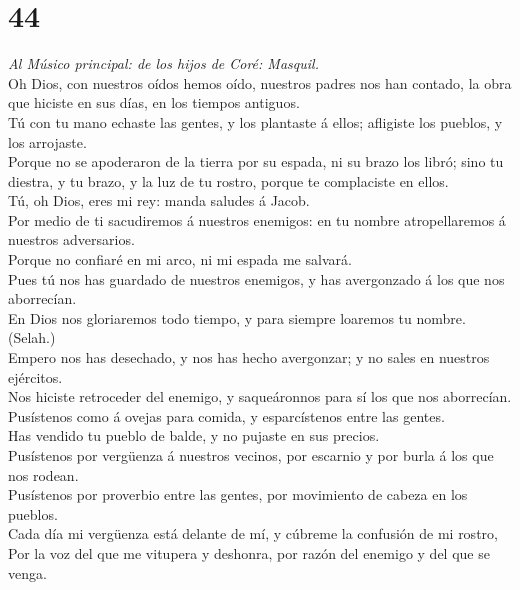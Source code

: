 \hypertarget{section-43}{%
\section{44}\label{section-43}}

 \emph{Al Músico principal: de los hijos de Coré:
Masquil.}\\
Oh Dios, con nuestros oídos hemos oído, nuestros padres nos han contado,
la obra que hiciste en sus días, en los tiempos antiguos.\\
 Tú con tu mano echaste las gentes, y los plantaste á ellos;
afligiste los pueblos, y los arrojaste.\\
 Porque no se apoderaron de la tierra por su espada, ni su
brazo los libró; sino tu diestra, y tu brazo, y la luz de tu rostro,
porque te complaciste en ellos.\\
 Tú, oh Dios, eres mi rey: manda saludes á Jacob.\\
 Por medio de ti sacudiremos á nuestros enemigos: en tu
nombre atropellaremos á nuestros adversarios.\\
 Porque no confiaré en mi arco, ni mi espada me salvará.\\
 Pues tú nos has guardado de nuestros enemigos, y has
avergonzado á los que nos aborrecían.\\
 En Dios nos gloriaremos todo tiempo, y para siempre
loaremos tu nombre. (Selah.)\\
 Empero nos has desechado, y nos has hecho avergonzar; y no
sales en nuestros ejércitos.\\
 Nos hiciste retroceder del enemigo, y saqueáronnos para sí
los que nos aborrecían.\\
 Pusístenos como á ovejas para comida, y esparcístenos
entre las gentes.\\
 Has vendido tu pueblo de balde, y no pujaste en sus
precios.\\
 Pusístenos por vergüenza á nuestros vecinos, por escarnio
y por burla á los que nos rodean.\\
 Pusístenos por proverbio entre las gentes, por movimiento
de cabeza en los pueblos.\\
 Cada día mi vergüenza está delante de mí, y cúbreme la
confusión de mi rostro,\\
 Por la voz del que me vitupera y deshonra, por razón del
enemigo y del que se venga.\\
